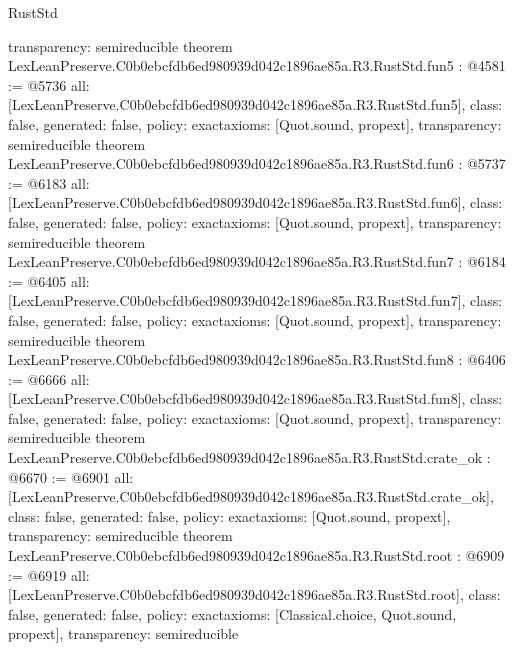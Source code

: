 \begin{lexlean}{RustStd}
\begin{coremodule}
{  transparency: semireducible
}
theorem LexLeanPreserve.C0b0ebcfdb6ed980939d042c1896ae85a.R3.RustStd.fun5 : @4581 := @5736 {
  all: [LexLeanPreserve.C0b0ebcfdb6ed980939d042c1896ae85a.R3.RustStd.fun5],
  class: false,
  generated: false,
  policy: exact{axioms: [Quot.sound, propext]},
  transparency: semireducible
}
theorem LexLeanPreserve.C0b0ebcfdb6ed980939d042c1896ae85a.R3.RustStd.fun6 : @5737 := @6183 {
  all: [LexLeanPreserve.C0b0ebcfdb6ed980939d042c1896ae85a.R3.RustStd.fun6],
  class: false,
  generated: false,
  policy: exact{axioms: [Quot.sound, propext]},
  transparency: semireducible
}
theorem LexLeanPreserve.C0b0ebcfdb6ed980939d042c1896ae85a.R3.RustStd.fun7 : @6184 := @6405 {
  all: [LexLeanPreserve.C0b0ebcfdb6ed980939d042c1896ae85a.R3.RustStd.fun7],
  class: false,
  generated: false,
  policy: exact{axioms: [Quot.sound, propext]},
  transparency: semireducible
}
theorem LexLeanPreserve.C0b0ebcfdb6ed980939d042c1896ae85a.R3.RustStd.fun8 : @6406 := @6666 {
  all: [LexLeanPreserve.C0b0ebcfdb6ed980939d042c1896ae85a.R3.RustStd.fun8],
  class: false,
  generated: false,
  policy: exact{axioms: [Quot.sound, propext]},
  transparency: semireducible
}
theorem LexLeanPreserve.C0b0ebcfdb6ed980939d042c1896ae85a.R3.RustStd.crate_ok : @6670 := @6901 {
  all: [LexLeanPreserve.C0b0ebcfdb6ed980939d042c1896ae85a.R3.RustStd.crate_ok],
  class: false,
  generated: false,
  policy: exact{axioms: [Quot.sound, propext]},
  transparency: semireducible
}
theorem LexLeanPreserve.C0b0ebcfdb6ed980939d042c1896ae85a.R3.RustStd.root : @6909 := @6919 {
  all: [LexLeanPreserve.C0b0ebcfdb6ed980939d042c1896ae85a.R3.RustStd.root],
  class: false,
  generated: false,
  policy: exact{axioms: [Classical.choice, Quot.sound, propext]},
  transparency: semireducible
}


\end{coremodule}
\end{lexlean}
